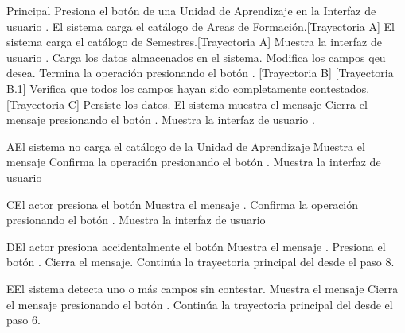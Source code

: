 \begin{UCtrayectoria}{Principal}
    \UCpaso[\UCactor] Presiona el botón  de una Unidad de Aprendizaje en la Interfaz de usuario  .
    \UCpaso El sistema carga el catálogo de Areas de Formación.[Trayectoria A]
    \UCpaso El sistema carga el catálogo de Semestres.[Trayectoria A]
    \UCpaso Muestra la interfaz de usuario .
    \UCpaso Carga los datos almacenados en el sistema.
    \UCpaso[\UCactor] Modifica los campos qeu desea.
    \UCpaso[\UCactor] Termina la operación presionando el botón . [Trayectoria B] [Trayectoria B.1]
    \UCpaso Verifica que todos los campos hayan sido completamente contestados. [Trayectoria C]
    \UCpaso Persiste los datos.
    \UCpaso El sistema muestra el mensaje 
    \UCpaso[\UCactor] Cierra el mensaje presionando el botón .
    \UCpaso Muestra la interfaz de usuario .
\end{UCtrayectoria}
\begin{UCtrayectoriaA}{A}{El sistema no carga el catálogo de la Unidad de Aprendizaje}
	\UCpaso Muestra el mensaje 
	\UCpaso[\UCactor] Confirma la operación presionando el botón .
	 \UCpaso Muestra la interfaz de usuario 
\end{UCtrayectoriaA}
\begin{UCtrayectoriaA}{C}{El actor presiona el botón }
	\UCpaso Muestra el mensaje .
	\UCpaso[\UCactor] Confirma la operación presionando el botón .
	\UCpaso Muestra la interfaz de usuario 
\end{UCtrayectoriaA}
\begin{UCtrayectoriaA}{D}{El actor presiona accidentalmente el botón }
	\UCpaso Muestra el mensaje .
	\UCpaso[\UCactor] Presiona el botón .
	\UCpaso Cierra el mensaje.
    \UCpaso Continúa la trayectoria principal del  desde el paso 8.
\end{UCtrayectoriaA}
\begin{UCtrayectoriaA}{E}{El sistema detecta uno o más campos sin contestar.}
	\UCpaso Muestra el mensaje 
	\UCpaso[\UCactor] Cierra el mensaje presionando el botón .
    \UCpaso Continúa la trayectoria principal del  desde el paso 6.
\end{UCtrayectoriaA}